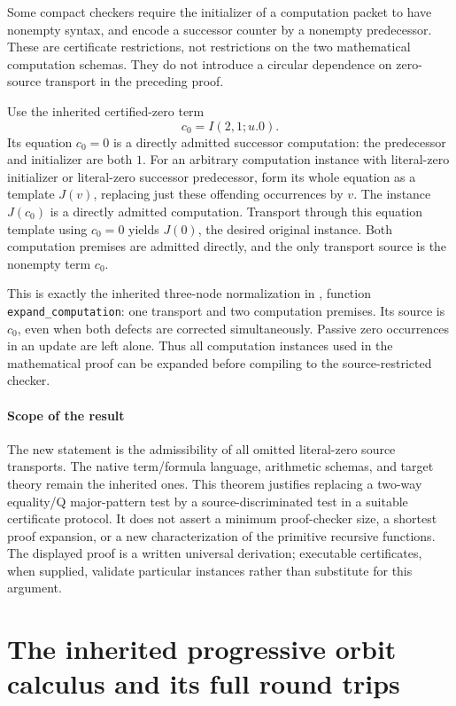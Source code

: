 \documentclass[11pt,a4paper]{article}
\theoremstyle{definition}\newtheorem{definition}[theorem]{Definition}
\begin{document}
Some compact checkers require the initializer of a computation packet
to have nonempty syntax, and encode a successor counter by a nonempty
predecessor. These are certificate restrictions, not restrictions
on the two mathematical computation schemas. They do not introduce
a circular dependence on zero-source transport in the preceding proof.

Use the inherited certified-zero term
\[
                         c_0=I(2,1;u.0).
\]
Its equation $c_0=0$ is a directly admitted successor computation:
the predecessor and initializer are both $1$. For an arbitrary
computation instance with literal-zero initializer or literal-zero
successor predecessor, form its whole equation as a template $J(v)$,
replacing just these offending occurrences by $v$. The instance
$J(c_0)$ is a directly admitted computation. Transport through this
equation template using $c_0=0$ yields $J(0)$, the desired original
instance. Both computation premises are admitted directly, and the
only transport source is the nonempty term $c_0$.

This is exactly the inherited three-node normalization in
, function
\texttt{expand\_computation}: one transport and two computation
premises. Its source is $c_0$, even when both defects are corrected
simultaneously. Passive zero occurrences in an update are left alone.
Thus all computation instances used in the mathematical proof can
be expanded before compiling to the source-restricted checker.

\subsection{Scope of the result}

The new statement is the admissibility of all omitted literal-zero
source transports. The native term/formula language, arithmetic
schemas, and target theory remain the inherited ones. This theorem
justifies replacing a two-way equality/Q major-pattern test by a
source-discriminated test in a suitable certificate protocol. It
does not assert a minimum proof-checker size, a shortest proof
expansion, or a new characterization of the primitive recursive
functions. The displayed proof is a written universal derivation;
executable certificates, when supplied, validate particular
instances rather than substitute for this argument.



\clearpage
\part{The inherited progressive orbit calculus and its full round trips}
\end{document}
